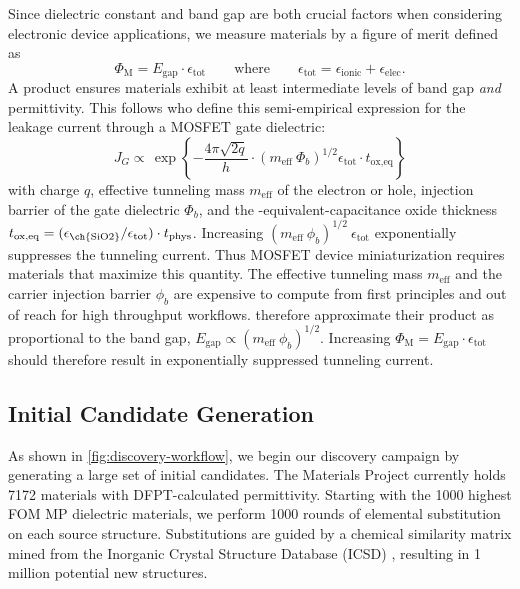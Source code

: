 \documentclass{article}
\newcommand{\fom}[1][]{\Phi_\text{M#1}}
\newcommand{\egap}{{E_\text{gap}}}
\newcommand{\epstot}{\epsilon_\text{tot}}
\newcommand{\epsionic}{\epsilon_\text{ionic}}
\newcommand{\epselec}{\epsilon_\text{elec}}
\begin{document}
Since dielectric constant and band gap are both crucial factors when considering electronic device applications, we measure materials by a figure of merit defined as
\begin{equation}
    \fom
    = \egap \cdot \epstot
    \qquad\text{where}\qquad\epstot = \epsionic + \epselec.
\end{equation}
\label{eq:fom}
A product ensures materials exhibit at least intermediate levels of band gap \textit{and} permittivity.
This follows \citeauthor*{yeo_mosfet_2003}\cite{yeo_mosfet_2003} who define this semi-empirical expression for the leakage current through a MOSFET gate dielectric:
\begin{equation}
    J_G
    \propto\,\exp \left\{{-} {\frac{4\pi \sqrt {2q}}{h}} \cdot \left(m_\text{eff} \ \Phi_b \right)^{1 / 2} \epstot \cdot t_\text{ox,eq} \right\}
\end{equation}
\label{eq:mosfet-leakage}
with charge $q$, effective tunneling mass $m_\text{eff}$ of the electron or hole, injection barrier of the gate dielectric $\Phi_b$, and the -equivalent-capacitance oxide thickness $t_\text{ox,eq} = (\epsilon_\text{\ch{SiO2}}/\epstot) \cdot t_\text{phys}$.
Increasing $(m_\text{eff} \ \phi_b)^{1/2} \ \epstot$ exponentially suppresses the tunneling current. Thus MOSFET device miniaturization requires materials that maximize this quantity.
The effective tunneling mass $m_\text{eff}$ and the carrier injection barrier $\phi_b$ are expensive to compute from first principles and out of reach for high throughput workflows.
\citeauthor*{hinkle_novel_2004}\cite{hinkle_novel_2004} therefore approximate their product as proportional to the band gap, $\egap \propto (m_\text{eff} \ \phi_b)^{1/2}$.
Increasing $\fom = \egap \cdot \epstot$ should therefore result in exponentially suppressed tunneling current.


\subsection{Initial Candidate Generation}
\label{sec:initial_candidate_generation}

As shown in \cref{fig:discovery-workflow}, we begin our discovery campaign by generating a large set of initial candidates.
The Materials Project currently holds \num{7172} materials with DFPT-calculated permittivity.
Starting with the 1000 highest FOM MP dielectric materials, we perform 1000 rounds of elemental substitution on each source structure.
Substitutions are guided by a chemical similarity matrix \cite{wang_predicting_2021} mined from the Inorganic Crystal Structure Database (ICSD) \cite{bergerhoff_inorganic_1983}, resulting in 1 million potential new structures.
\end{document}
